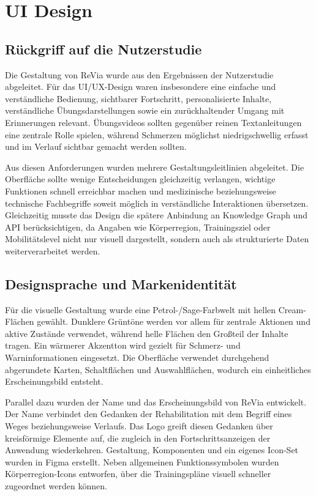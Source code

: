 \section{UI Design}

\subsection{Rückgriff auf die Nutzerstudie}

Die Gestaltung von ReVia wurde aus den Ergebnissen der Nutzerstudie abgeleitet. Für das UI/UX-Design waren insbesondere eine einfache und verständliche Bedienung, sichtbarer Fortschritt, personalisierte Inhalte, verständliche Übungsdarstellungen sowie ein zurückhaltender Umgang mit Erinnerungen relevant. Übungsvideos sollten gegenüber reinen Textanleitungen eine zentrale Rolle spielen, während Schmerzen möglichst niedrigschwellig erfasst und im Verlauf sichtbar gemacht werden sollten.

Aus diesen Anforderungen wurden mehrere Gestaltungsleitlinien abgeleitet. Die Oberfläche sollte wenige Entscheidungen gleichzeitig verlangen, wichtige Funktionen schnell erreichbar machen und medizinische beziehungsweise technische Fachbegriffe soweit möglich in verständliche Interaktionen übersetzen. Gleichzeitig musste das Design die spätere Anbindung an Knowledge Graph und API berücksichtigen, da Angaben wie Körperregion, Trainingsziel oder Mobilitätslevel nicht nur visuell dargestellt, sondern auch als strukturierte Daten weiterverarbeitet werden.

\subsection{Designsprache und Markenidentität}

Für die visuelle Gestaltung wurde eine Petrol-/Sage-Farbwelt mit hellen Cream-Flächen gewählt. Dunklere Grüntöne werden vor allem für zentrale Aktionen und aktive Zustände verwendet, während helle Flächen den Großteil der Inhalte tragen. Ein wärmerer Akzentton wird gezielt für Schmerz- und Warninformationen eingesetzt. Die Oberfläche verwendet durchgehend abgerundete Karten, Schaltflächen und Auswahlflächen, wodurch ein einheitliches Erscheinungsbild entsteht.

Parallel dazu wurden der Name und das Erscheinungsbild von ReVia entwickelt. Der Name verbindet den Gedanken der Rehabilitation mit dem Begriff eines Weges beziehungsweise Verlaufs. Das Logo greift diesen Gedanken über kreisförmige Elemente auf, die zugleich in den Fortschrittsanzeigen der Anwendung wiederkehren. Gestaltung, Komponenten und ein eigenes Icon-Set wurden in Figma erstellt. Neben allgemeinen Funktionssymbolen wurden Körperregion-Icons entworfen, über die Trainingspläne visuell schneller zugeordnet werden können.

